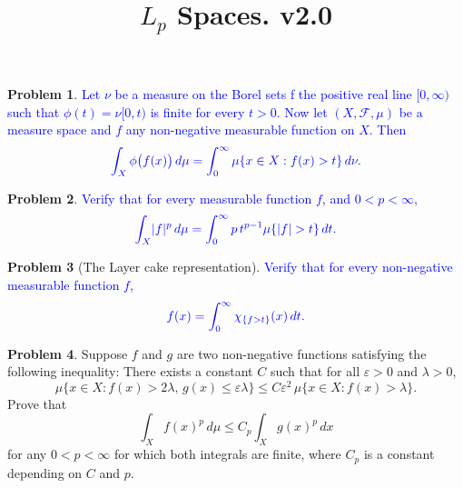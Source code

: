 \documentclass[12pt,reqno]{amsart}
\def\abs#1{\lvert {#1} \rvert}
\theoremstyle{definition}
\newtheorem{problem}{Problem}
\theoremstyle{remark}
\begin{document}
\title{$L_p$ Spaces. v2.0}
\maketitle

\begin{problem}
  \textcolor{blue}{Let $\nu$ be a measure on the Borel sets f the
    positive real line $[0,\infty)$ such that $\phi(t) = \nu[0,t)$ is
    finite for every $t > 0$.  Now let $(X,\mathcal{F},\mu)$ be a
    measure space and $f$ any non-negative measurable function on $X$.
    Then}
  \begin{equation*}
    \textcolor{blue}{\int_X \phi\big( f(x) \big)\, d\mu = \int_0^\infty
    \mu\{ x \in X : f(x) > t \}\, d\nu.}
  \end{equation*} 
\end{problem}
\begin{problem}
  \textcolor{blue}{Verify that for every measurable function $f$, and
    $0<p<\infty$,}
  \begin{equation*}
    \textcolor{blue}{\int_X \abs{f}^p\, d\mu = \int_0^\infty p\,
    t^{p-1} \mu\{ \abs{f} > t \}\, dt.}
  \end{equation*}
\end{problem}
\begin{problem}[The Layer cake representation]
  \textcolor{blue}{Verify that for every non-negative measurable
  function $f$,}
  \begin{equation*}
    \textcolor{blue}{f(x) = \int_0^\infty \chi_{\{f > t\}}(x)\, dt.}
  \end{equation*}
\end{problem}
\begin{problem}
  Suppose $f$ and $g$ are two non-negative functions satisfying the
  following inequality: There exists a constant $C$ such that for all
  $\varepsilon >0$ and $\lambda >0$,
  \begin{equation*}
    \mu \{ x \in X: f(x) > 2\lambda,\, g(x) \leq \varepsilon \lambda \}
    \leq C \varepsilon^2\, \mu \{ x \in X: f(x) > \lambda \}.
  \end{equation*}
  Prove that
  \begin{equation*}
    \int_X f(x)^p\, d\mu \leq C_p \int_X g(x)^p\, dx
  \end{equation*}
  for any $0<p<\infty$ for which both integrals are finite, where
  $C_p$ is a constant depending on $C$ and $p$.
\end{problem}
\end{document}
